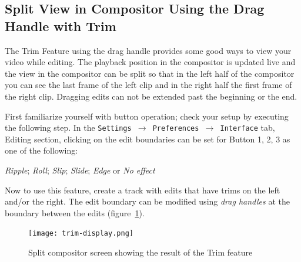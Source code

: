 \subsection{Split View in Compositor Using the Drag Handle with Trim}%
\label{sub:split_view_compositor_using_drag_trim}

The Trim Feature using the drag handle provides some good ways to
view your video while editing.  The playback position in the
compositor is updated live and the view in the compositor can be
split so that in the left half of the compositor you can see the
last frame of the left clip and in the right half the first frame of
the right clip.  Dragging edits can not be extended past the
beginning or the end.

First familiarize yourself with button operation; check your setup
by executing the following step.  In the \texttt{Settings
	$\rightarrow$ Preferences $\rightarrow$ Interface} tab, Editing
section, clicking on the edit boundaries can be set for Button 1, 2,
3 as one of the following:

\textit{Ripple}; \textit{Roll}; \textit{Slip}; \textit{Slide};
\textit{Edge} or \textit{No effect}

Now to use this feature, create a track with edits that have trims
on the left and/or the right. The edit boundary can be modified
using \textit{drag handles} at the boundary between the edits
(figure~\ref{fig:trim-display}).

\begin{figure}[htpb]
	\centering
	\texttt{[image: trim-display.png]}
	\caption{Split compositor screen showing the result of the Trim feature}
	\label{fig:trim-display}
\end{figure}

